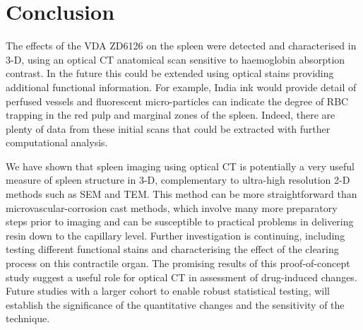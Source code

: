 	\section{Conclusion} 
	The effects of the VDA ZD6126 on the spleen were detected and characterised in 3-D, using an optical CT anatomical scan sensitive to haemoglobin absorption contrast. In the future this could be extended using optical stains providing additional functional information. For example, India ink would provide detail of perfused vessels and fluorescent micro-particles can indicate the degree of RBC trapping in the red pulp and marginal zones of the spleen. Indeed, there are plenty of data from these initial scans that could be extracted with further computational analysis.
	
	We have shown that spleen imaging using optical CT is potentially a very useful measure of spleen structure in 3-D, complementary to ultra-high resolution 2-D methods such as SEM and TEM. This method can be more straightforward than microvascular-corrosion cast methods, which involve many more preparatory steps prior to imaging and can be susceptible to practical problems in delivering resin down to the capillary level. Further investigation is continuing, including testing different functional stains and characterising the effect of the clearing process on this contractile organ. The promising results of this proof-of-concept study suggest a useful role for optical CT in assessment of drug-induced changes. Future studies with a larger cohort to enable robust statistical testing, will establish the significance of the quantitative changes and the sensitivity of the technique. 
	
